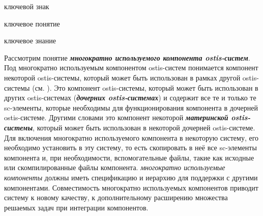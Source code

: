 \begin{SCn}
\begin{scnrelfromlist}{ключевой знак}
\end{scnrelfromlist}
\end{SCn}

\begin{SCn}
\begin{scnrelfromlist}{ключевое понятие}
\end{scnrelfromlist}
\end{SCn}

\begin{SCn}
\begin{scnrelfromlist}{ключевое знание}
\end{scnrelfromlist}
\end{SCn}

\bigskip

Рассмотрим понятие \textbf{\textit{многократно используемого компонента ostis-систем}}. Под многократно используемым компонентом ostis-систем понимается компонент некоторой ostis-системы, который может быть использован в рамках другой ostis-системы (см. ). Это компонент ostis-системы, который может быть использован в других ostis-системах (\textbf{\textit{дочерних ostis-системах}}) и содержит все те и только те sc-элементы, которые необходимы для функционирования компонента в дочерней ostis-системе. Другими словами это компонент некоторой \textbf{\textit{материнской ostis-системы}}, который может быть использован в некоторой дочерней ostis-системе. Для включения многократно используемого компонента в некоторую систему, его необходимо установить в эту систему, то есть скопировать в неё все sc-элементы компонента и, при необходимости, вспомогательные файлы, такие как исходные или скомпилированные файлы компонента. \textit{многократно используемые компоненты} должны иметь  спецификацию и иерархию для поддержки  с другими компонентами. Совместимость многократно используемых компонентов приводит систему к новому качеству, к дополнительному расширению множества решаемых задач при интеграции компонентов.

